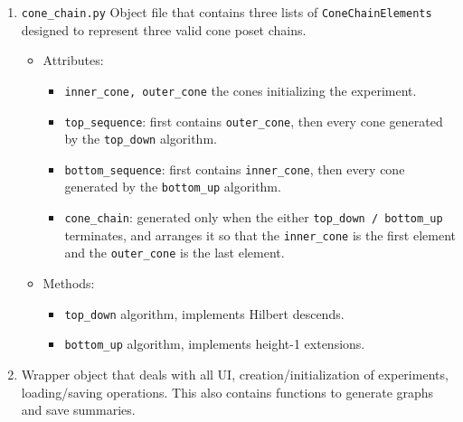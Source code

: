 \documentclass{TC}
\begin{document}
\begin{enumerate}
\item \texttt{cone\_chain.py} Object file that contains three lists of \texttt{ConeChainElements} designed to represent three valid cone poset chains. 
	\begin{itemize}
	\item Attributes:
		\begin{itemize}
		\item \texttt{inner\_cone, outer\_cone} the cones initializing the experiment.
		\item \texttt{top\_sequence}: first contains \texttt{outer\_cone}, then every cone generated by the \texttt{top\_down} algorithm.
		\item \texttt{bottom\_sequence}: first contains \texttt{inner\_cone}, then every cone generated by the \texttt{bottom\_up} algorithm.
		\item \texttt{cone\_chain}: generated only when the either \texttt{top\_down / bottom\_up} terminates, and arranges it so that the \texttt{inner\_cone} is the first element and the \texttt{outer\_cone} is the last element.
		\end{itemize}
	\item Methods:
		\begin{itemize}
		\item \texttt{top\_down} algorithm, implements Hilbert descends.
		\item \texttt{bottom\_up} algorithm, implements height-1 extensions.
		\end{itemize}
	\end{itemize}
\item {} Wrapper object that deals with all UI, creation/initialization of experiments, loading/saving operations. This also contains functions to generate graphs and save summaries.
\end{enumerate}
\end{document}
